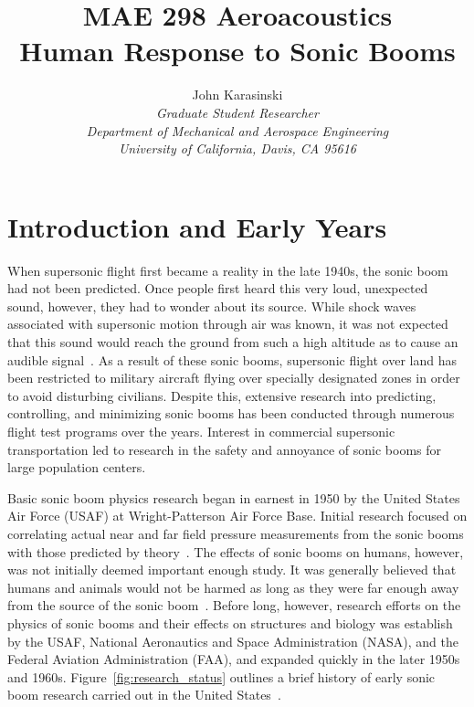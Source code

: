 \documentclass[]{aiaa-tc}%
\title{MAE 298 Aeroacoustics \\ Human Response to Sonic Booms}
\author{ John Karasinski \\
  {\normalsize\itshape Graduate Student Researcher} \\
  {\normalsize\itshape Department of Mechanical and Aerospace Engineering} \\
  {\normalsize\itshape University of California, Davis, CA 95616}
}
\begin{document}
\maketitle


\section{Introduction and Early Years}
When supersonic flight first became a reality in the late 1940s, the sonic boom had not been predicted. Once people first heard this very loud, unexpected sound, however, they had to wonder about its source. While shock waves associated with supersonic motion through air was known, it was not expected that this sound would reach the ground from such a high altitude as to cause an audible signal~\cite{von1966effects}. As a result of these sonic booms, supersonic flight over land has been restricted to military aircraft flying over specially designated zones in order to avoid disturbing civilians. Despite this, extensive research into predicting, controlling, and minimizing sonic booms has been conducted through numerous flight test programs over the years. Interest in commercial supersonic transportation led to research in the safety and annoyance of sonic booms for large population centers.

Basic sonic boom physics research began in earnest in 1950 by the United States Air Force (USAF) at Wright-Patterson Air Force Base. Initial research focused on correlating actual near and far field pressure measurements from the sonic booms with those predicted by theory~\cite{von1957aircraft}. The effects of sonic booms on humans, however, was not initially deemed important enough study. It was generally believed that humans and animals would not be harmed as long as they were far enough away from the source of the sonic boom~\cite{von1966effects}. Before long, however, research efforts on the physics of sonic booms and their effects on structures and biology was establish by the USAF, National Aeronautics and Space Administration (NASA), and the Federal Aviation Administration (FAA), and expanded quickly in the later 1950s and 1960s. Figure~\ref{fig:research_status} outlines a brief history of early sonic boom research carried out in the United States~\cite{nixon1965sonic}.
\end{document}
